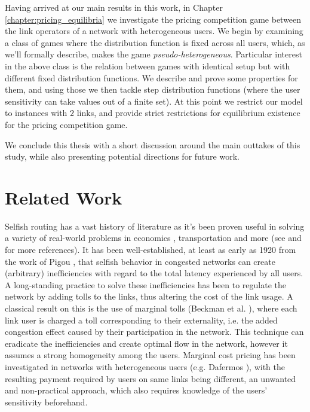 \documentclass[10pt,a4paper]{book}
\theoremstyle{definition}
\theoremstyle{comment}
\begin{document}
Having arrived at our main results in this work, in Chapter \ref{chapter:pricing_equilibria} we investigate the pricing competition game between the link operators of a network with heterogeneous users.
We begin by examining a class of games where the distribution function is fixed across all users, which, as we'll formally describe, makes the game \textit{pseudo-heterogeneous}.
Particular interest in the above class is the relation between games with identical setup but with different fixed distribution functions.
We describe and prove some properties for them, and using those we then tackle step distribution functions (where the user sensitivity can take values out of a finite set).
At this point we restrict our model to instances with $2$ links, and provide strict restrictions for equilibrium existence for the pricing competition game.

We conclude this thesis with a short discussion around the main outtakes of this study, while also presenting potential directions for future work.


\section{Related Work}
\label{section:related_work}

Selfish routing has a vast history of literature as it's been proven useful in solving a variety of real-world problems in economics \cite{pigou1920economics}, transportation \cite{beckmann1956studies} and more (see \cite{roughgarden2002sr} and \cite{roughgarden2005slpoa} for more references).
It has been well-established, at least as early as 1920 from the work of Pigou \cite{pigou1920economics}, that selfish behavior in congested networks can create (arbitrary) inefficiencies with regard to the total latency experienced by all users.
A long-standing practice to solve these inefficiencies has been to regulate the network by adding tolls to the links, thus altering the cost of the link usage.
A classical result on this is the use of marginal tolls (Beckman et al. \cite{beckmann1956studies}), where each link user is charged a toll corresponding to their externality, i.e. the added congestion effect caused by their participation in the network.
This technique can eradicate the inefficiencies and create optimal flow in the network, however it assumes a strong homogeneity among the users.
Marginal cost pricing has been investigated in networks with heterogeneous users (e.g. Dafermos \cite{dafermos1973toll}), with the resulting payment required by users on same links being different, an unwanted and non-practical approach, which also requires knowledge of the users' sensitivity beforehand.
\end{document}
